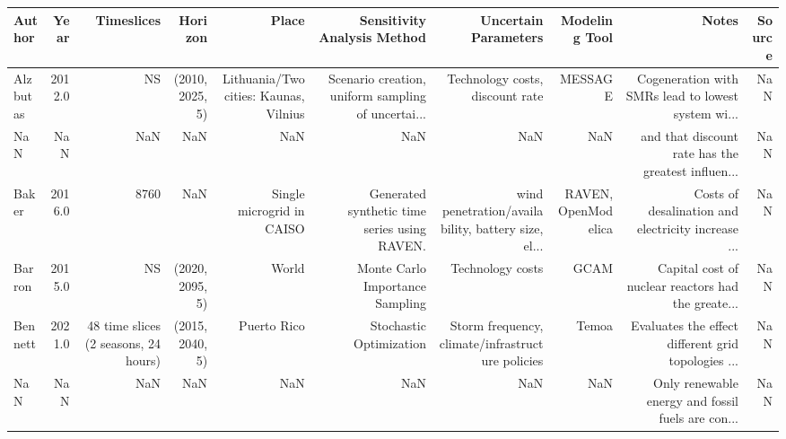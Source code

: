 \begin{tabular}{lrrrrrrrrr}
\toprule
      Author &   Year &                                         Timeslices &         Horizon &                                 Place &                        Sensitivity Analysis Method &                               Uncertain Parameters &                     Modeling Tool &                                              Notes &  Source \\
\midrule
    Alzbutas & 2012.0 &                                                 NS &   (2010,2025,5) & Lithuania/Two cities: Kaunas, Vilnius & Scenario creation, uniform sampling of uncertai... &                    Technology costs, discount rate &                           MESSAGE & Cogeneration with SMRs lead to lowest system wi... &     NaN \\
         NaN &    NaN &                                                NaN &             NaN &                                   NaN &                                                NaN &                                                NaN &                               NaN & and that discount rate has the greatest influen... &     NaN \\
       Baker & 2016.0 &                                               8760 &             NaN &             Single microgrid in CAISO &      Generated synthetic time series using RAVEN.  & wind penetration/availability, battery size, el... &               RAVEN, OpenModelica & Costs of desalination and electricity increase ... &     NaN \\
      Barron & 2015.0 &                                                 NS &   (2020,2095,5) &                                 World &                    Monte Carlo Importance Sampling &                                   Technology costs &                              GCAM & Capital cost of nuclear reactors had the greate... &     NaN \\
     Bennett & 2021.0 &               48 time slices (2 seasons, 24 hours) &   (2015,2040,5) &                           Puerto Rico &                            Stochastic Optimization &   Storm frequency, climate/infrastructure policies &                             Temoa & Evaluates the effect different grid topologies ... &     NaN \\
         NaN &    NaN &                                                NaN &             NaN &                                   NaN &                                                NaN &                                                NaN &                               NaN &  Only renewable energy and fossil fuels are con... &     NaN \\

\end{tabular}
